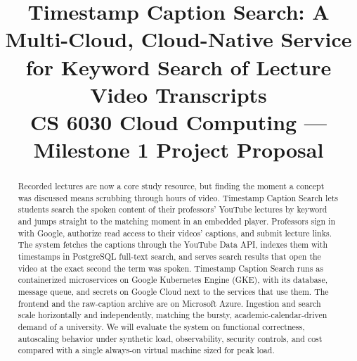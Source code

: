 \documentclass[conference]{IEEEtran}
\begin{document}
\title{Timestamp Caption Search: A Multi-Cloud, Cloud-Native Service for Keyword Search of Lecture Video Transcripts\\[0.4em]
{\large CS 6030 Cloud Computing --- Milestone 1 Project Proposal}}

\author{
\and
{}
\and
{}
}

\maketitle

\begin{abstract}
Recorded lectures are now a core study resource, but finding the moment a concept was discussed means scrubbing through hours of video. Timestamp Caption Search lets students search the spoken content of their professors' YouTube lectures by keyword and jumps straight to the matching moment in an embedded player. Professors sign in with Google, authorize read access to their videos' captions, and submit lecture links. The system fetches the captions through the YouTube Data API, indexes them with timestamps in PostgreSQL full-text search, and serves search results that open the video at the exact second the term was spoken. Timestamp Caption Search runs as containerized microservices on Google Kubernetes Engine (GKE), with its database, message queue, and secrets on Google Cloud next to the services that use them. The frontend and the raw-caption archive are on Microsoft Azure. Ingestion and search scale horizontally and independently, matching the bursty, academic-calendar-driven demand of a university. We will evaluate the system on functional correctness, autoscaling behavior under synthetic load, observability, security controls, and cost compared with a single always-on virtual machine sized for peak load.
\end{abstract}
\end{document}
